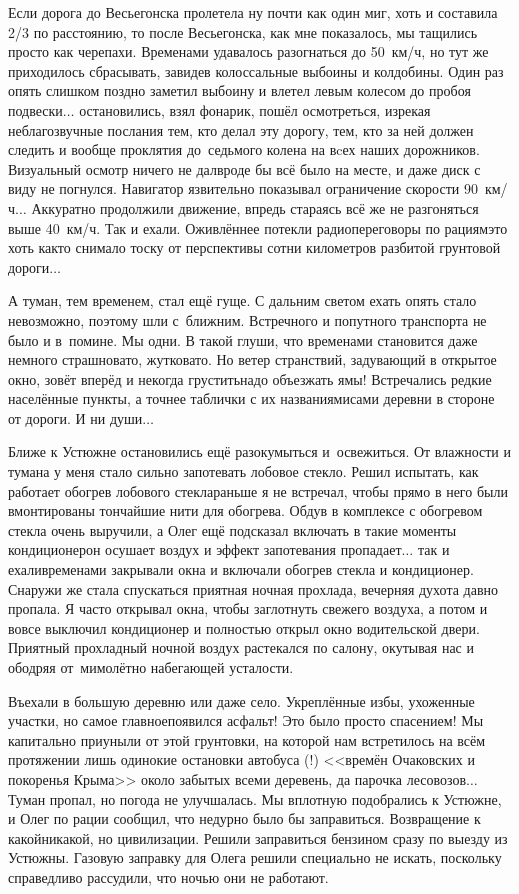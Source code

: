 Если дорога до Весьегонска пролетела ну почти как один миг, хоть и составила 2/3 по расстоянию, то после Весьегонска, как мне показалось, мы тащились просто как черепахи. Временами удавалось разогнаться до 50~км/ч, но тут же приходилось сбрасывать, завидев колоссальные выбоины и колдобины. Один раз опять слишком поздно заметил выбоину и влетел левым колесом до пробоя подвески$\ldots$ остановились, взял фонарик, пошёл осмотреться, изрекая неблагозвучные послания тем, кто делал эту дорогу, тем, кто за ней должен следить и вообще проклятия до~седьмого колена на вcех наших дорожников. Визуальный осмотр ничего не дал\mdash вроде бы всё было на месте, и даже диск с виду не погнулся. Навигатор язвительно показывал ограничение скорости 90~км/ч$\ldots$ Аккуратно продолжили движение, впредь стараясь всё же не разгоняться выше 40~км/ч. Так и ехали. Оживлённее потекли радиопереговоры по рациям\mdash это хоть как\sdash то снимало тоску от перспективы сотни километров разбитой грунтовой дороги$\ldots$

А туман, тем временем, стал ещё гуще. С дальним светом ехать опять стало невозможно, поэтому шли с~ближним. Встречного и попутного транспорта не было и в~помине. Мы одни. В такой глуши, что временами становится даже немного страшновато, жутковато. Но ветер странствий, задувающий в открытое окно, зовёт вперёд и некогда грустить\mdash надо объезжать ямы! Встречались редкие населённые пункты, а точнее таблички с их названиями\mdash сами деревни в стороне от дороги. И ни души$\ldots$

Ближе к Устюжне остановились ещё разок\mdash умыться и~освежиться. От влажности и тумана у меня стало сильно запотевать лобовое стекло. Решил испытать, как работает обогрев лобового стекла\mdash раньше я не встречал, чтобы прямо в него были вмонтированы тончайшие нити для обогрева. Обдув в комплексе с обогревом стекла очень выручили, а Олег ещё подсказал включать в такие моменты кондиционер\mdash он осушает воздух и эффект запотевания пропадает$\ldots$ так и ехали\mdash временами закрывали окна и включали обогрев стекла и кондиционер. Снаружи же стала спускаться приятная ночная прохлада, вечерняя духота давно пропала. Я часто открывал окна, чтобы заглотнуть свежего воздуха, а потом и вовсе выключил кондиционер и полностью открыл окно водительской двери. Приятный прохладный ночной воздух растекался по салону, окутывая нас и ободряя от~мимолётно набегающей усталости.

Въехали в большую деревню или даже село. Укреплённые избы, ухоженные участки, но самое главное\mdash появился асфальт! Это было просто спасением! Мы капитально приуныли от этой грунтовки, на которой нам встретилось на всём протяжении лишь одинокие остановки автобуса (!) <<времён Очаковских и покоренья Крыма>> около забытых всеми деревень, да парочка лесовозов$\ldots$ Туман пропал, но погода не улучшалась. Мы вплотную подобрались к Устюжне, и Олег по рации сообщил, что недурно было бы заправиться. Возвращение к какой\sdash никакой, но цивилизации. Решили заправиться бензином сразу по выезду из Устюжны. Газовую заправку для Олега решили специально не искать, поскольку справедливо рассудили, что ночью они не работают.

